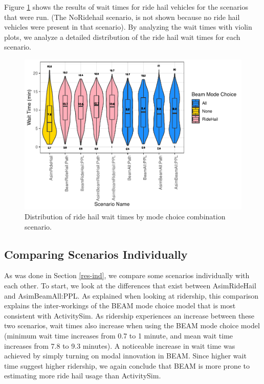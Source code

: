 \documentclass[fancy, masters]{byuthesis}
\begin{document}
Figure \ref{fig:waits} shows the results of wait times for ride hail vehicles for the scenarios that were run. (The NoRidehail scenario, is not shown because no ride hail vehicles were present in that scenario). By analyzing the wait times with violin plots, we analyze a detailed distribution of the ride hail wait times for each scenario.

\begin{figure}

{\centering \includegraphics{thesis_files/figure-latex/waits-1} 

}

\caption{Distribution of ride hail wait times by mode choice combination scenario.}\label{fig:waits}
\end{figure}

\hypertarget{comparing-scenarios-individually}{%
\subsection{Comparing Scenarios Individually}\label{comparing-scenarios-individually}}

As was done in Section \ref{res-ind}, we compare some scenarios individually with each other. To start, we look at the differences that exist between AsimRideHail and AsimBeamAll:PPL. As explained when looking at ridership, this comparison explains the inter-workings of the BEAM mode choice model that is most consistent with ActivitySim. As ridership experiences an increase between these two scenarios, wait times also increase when using the BEAM mode choice model (minimum wait time increases from 0.7 to 1 minute, and mean wait time increases from 7.8 to 9.3 minutes). A noticeable increase in wait time was achieved by simply turning on modal innovation in BEAM. Since higher wait time suggest higher ridership, we again conclude that BEAM is more prone to estimating more ride hail usage than ActivitySim.
\end{document}
